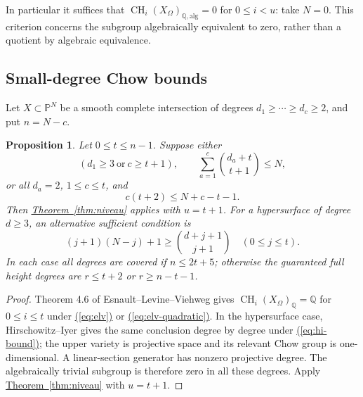 \documentclass[11pt,a4paper]{article}
\newtheorem{proposition}[theorem]{Proposition}
\theoremstyle{definition}
\theoremstyle{remark}\newtheorem{remark}[theorem]{Remark}
\numberwithin{equation}{section}
\newcommand{\Q}{\mathbb Q}\newcommand{\R}{\mathbb R}\newcommand{\C}{\mathbb C}
\newcommand{\PP}{\mathbb P}\newcommand{\LL}{\mathbb L}
\newcommand{\CH}{\operatorname{CH}}\newcommand{\an}{\mathrm{an}}
\newcommand{\alg}{\mathrm{alg}}\newcommand{\geomhom}{\mathrm{geom\,hom}}
\newcommand{\thmref}[1]{\hyperref[#1]{\textcolor{resultlink}{Theorem~\ref*{#1}}}}
\renewcommand{\eqref}[1]{\hyperref[#1]{\textcolor{equationlink}{(\ref*{#1})}}}
\begin{document}
In particular it suffices that
$\CH_i(X_\Omega)_{\Q,\alg}=0$ for $0\leq i<u$: take $N=0$.
This criterion concerns the subgroup algebraically equivalent to
zero, rather than a quotient by algebraic equivalence.

\subsection{Small-degree Chow bounds}

Let $X\subset\PP^N$ be a smooth complete intersection of degrees
$d_1\geq\cdots\geq d_c\geq2$, and put $n=N-c$.

\begin{proposition}\label{prop:small-degree}
Let $0\leq t\leq n-1$. Suppose either
\begin{equation}\label{eq:elv}
 \left(d_1\geq3\ \text{or}\ c\geq t+1\right),\qquad
 \sum_{a=1}^c\binom{d_a+t}{t+1}\leq N,
\end{equation}
or all $d_a=2$, $1\leq c\leq t$, and
\begin{equation}\label{eq:elv-quadratic}
 c(t+2)\leq N+c-t-1.
\end{equation}
Then \thmref{thm:niveau} applies with $u=t+1$.
For a hypersurface of degree $d\geq3$, an alternative sufficient
condition is
\begin{equation}\label{eq:hi-bound}
 (j+1)(N-j)+1\geq\binom{d+j+1}{j+1}
             \quad(0\leq j\leq t).
\end{equation}
In each case all degrees are covered if $n\leq2t+5$; otherwise
the guaranteed full height degrees are $r\leq t+2$ or
$r\geq n-t-1$.
\end{proposition}

\begin{proof}
Theorem 4.6 of Esnault--Levine--Viehweg \cite{ELV} gives
$\CH_i(X_\Omega)_\Q=\Q$ for $0\leq i\leq t$ under
\eqref{eq:elv} or \eqref{eq:elv-quadratic}. In the hypersurface
case, Hirschowitz--Iyer \cite[Theorem 1.5]{HI} gives the same
conclusion degree by degree under \eqref{eq:hi-bound}; the upper
variety is projective space and its relevant Chow group is
one-dimensional. A linear-section generator has nonzero projective
degree. The algebraically trivial subgroup is therefore zero in
all these degrees. Apply \thmref{thm:niveau} with $u=t+1$.
\end{proof}
\end{document}
